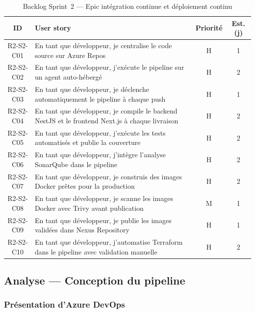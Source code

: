 \begin{table}[H]
\centering
\caption{Backlog Sprint~2 — Epic intégration continue et déploiement continu}
\label{tab:r2-s2-backlog}
\footnotesize
\renewcommand{\arraystretch}{0.85}
\setlength{\tabcolsep}{4pt}
\begin{tabular}{|c|p{7.8cm}|c|c|}
\hline
\textbf{ID} & \textbf{User story} & \textbf{Priorité} & \textbf{Est. (j)} \\
\hline
R2-S2-C01 &
  En tant que développeur, je centralise le code source sur Azure Repos &
  H & 1 \\
\hline
R2-S2-C02 &
  En tant que développeur, j'exécute le pipeline sur un agent auto-hébergé &
  H & 2 \\
\hline
R2-S2-C03 &
  En tant que développeur, je déclenche automatiquement le pipeline à chaque push &
  H & 1 \\
\hline
R2-S2-C04 &
  En tant que développeur, je compile le backend NestJS et le frontend Next.js à chaque livraison &
  H & 2 \\
\hline
R2-S2-C05 &
  En tant que développeur, j'exécute les tests automatisés et publie la couverture &
  H & 2 \\
\hline
R2-S2-C06 &
  En tant que développeur, j'intègre l'analyse SonarQube dans le pipeline &
  H & 2 \\
\hline
R2-S2-C07 &
  En tant que développeur, je construis des images Docker prêtes pour la production &
  H & 2 \\
\hline
R2-S2-C08 &
  En tant que développeur, je scanne les images Docker avec Trivy avant publication &
  M & 1 \\
\hline
R2-S2-C09 &
  En tant que développeur, je publie les images validées dans Nexus Repository &
  H & 1 \\
\hline
R2-S2-C10 &
  En tant que développeur, j'automatise Terraform dans le pipeline avec validation manuelle &
  H & 2 \\
\hline
\end{tabular}
\end{table}


\subsection{Analyse — Conception du pipeline}

\subsubsection{Présentation d'Azure DevOps}

